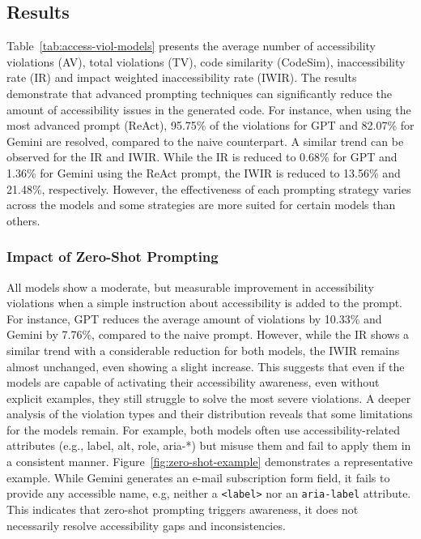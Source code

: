 \subsection{Results}
Table~\ref{tab:access-viol-models} presents the average number of accessibility 
violations (AV), total violations (TV), code similarity (CodeSim),
inaccessibility rate (IR) and impact weighted inaccessibility rate (IWIR).
The results demonstrate that advanced prompting techniques can significantly
reduce the amount of accessibility issues in the generated code. For instance,
when using the most advanced prompt (ReAct), 95.75\% of the violations for 
GPT and 82.07\% for Gemini are resolved, compared to the naive counterpart.
A similar trend can be observed for the IR and IWIR. While the 
IR is reduced to 0.68\% for GPT and 1.36\% for Gemini using the ReAct 
prompt, the IWIR is reduced to 13.56\% and 21.48\%, respectively. However, 
the effectiveness of each prompting strategy varies across the models and 
some strategies are more suited for certain models than others.


\begingroup
    
\endgroup

\subsubsection{Impact of Zero-Shot Prompting}
All models show a moderate, but measurable improvement in accessibility 
violations when a simple instruction about accessibility is added to 
the prompt. For instance, GPT reduces the average amount of 
violations by 10.33\% and Gemini by 7.76\%, compared to the 
naive prompt. However, while the IR shows a similar trend with 
a considerable reduction for both models, the IWIR remains almost 
unchanged, even showing a slight increase. This suggests that even 
if the models are capable of activating their accessibility 
awareness, even without explicit examples, they still struggle to 
solve the most severe violations.\newline
A deeper analysis of the violation types and their distribution 
reveals that some limitations for the models remain. For example,
both models often use accessibility-related attributes (e.g., 
label, alt, role, aria-*) but misuse them and fail to apply them 
in a consistent manner. Figure~\ref{fig:zero-shot-example} demonstrates
a representative example. While Gemini generates an e-mail 
subscription form field, it fails to provide any accessible name,
e.g, neither a \texttt{<label>} nor an \texttt{aria-label} attribute.
This indicates that zero-shot prompting triggers awareness, it 
does not necessarily resolve accessibility gaps and inconsistencies.



